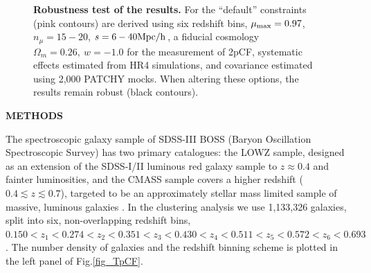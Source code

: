 \documentclass{natureprintstyle}
\begin{document}
\begin{figure}[tb]
   \caption{\label{fig_contest}
   {\bf Robustness test of the results.}
   For the ``default'' constraints (pink contours) are derived using six redshift bins, 
   $\mu_{\rm max}=0.97$, $n_{\mu}=15-20$, $s=6-40 \rm Mpc/h$,
   a fiducial cosmology $\Omega_m=0.26,\ w=-1.0$ for the measurement of 2pCF,
   systematic effects estimated from HR4 simulations, 
   and covariance estimated using 2,000 PATCHY mocks.
   When altering these options, the results remain robust (black contours).
   }
\end{figure}


\clearpage
\setcounter{page}{1}
\setcounter{figure}{0}
\setcounter{table}{0}

\begin{center}
{\textbf{ \Large \uppercase{Methods}} }
\end{center}

\noindent
The spectroscopic galaxy sample of SDSS-III BOSS (Baryon Oscillation Spectroscopic Survey) has two primary catalogues:
the LOWZ sample, designed as an extension of the SDSS-I/II luminous red galaxy sample to $z\approx 0.4$ and fainter luminosities,
and the CMASS sample covers a higher redshift ($0.4\lesssim z \lesssim 0.7$),
targeted to be an approximately stellar mass limited sample of massive, luminous galaxies \cite{Reidetal:2016}.
In the clustering analysis we use 1,133,326 galaxies, split into six, non-overlapping redshift bins, 
$0.150<z_1<0.274<z_2<0.351<z_3<0.430<z_4<0.511<z_5<0.572<z_6<0.693$.
The number density of galaxies and the redshift binning scheme is plotted in the left panel of Fig.\ref{fig_TpCF}.
\end{document}
